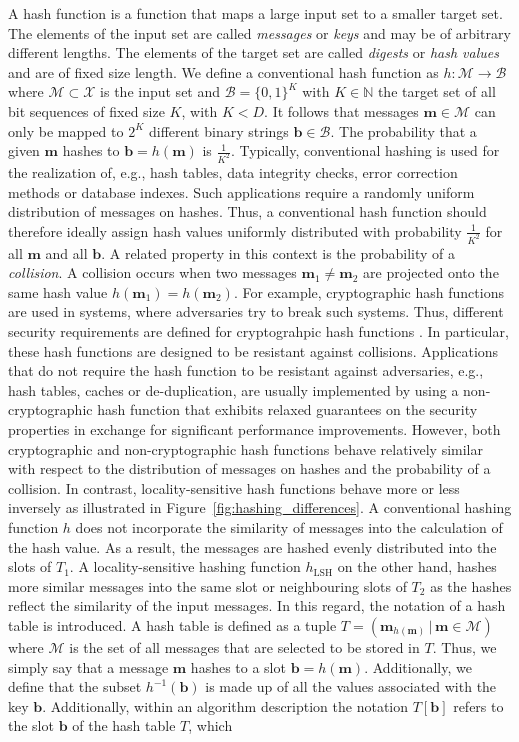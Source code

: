 \documentclass[../../../main.tex]{subfiles}
\begin{document}
A hash function is a function that maps a large input set to a smaller target set. The elements of the input set are called \textit{messages} or \textit{keys} and may be of arbitrary different lengths. The elements of the target set are called \textit{digests} or \textit{hash values} and are of fixed size length. We define a conventional hash function as $h: \mathcal{M} \rightarrow \mathcal{B}$ where $\mathcal{M} \subset \mathcal{X}$ is the input set and $\mathcal{B}=\{0, 1\}^K$ with $K \in \mathbb{N}$ the target set of all bit sequences of fixed size $K$, with $K < D$. It follows that messages $\bm{m} \in \mathcal{M}$ can only be mapped to $2^K$ different binary strings $\bm{b} \in \mathcal{B}$. The probability that a given $\bm{m}$ hashes to $\bm{b} = h(\bm{m})$ is $\frac{1}{K^2}$. Typically, conventional hashing is used for the realization of, e.g., hash tables, data integrity checks, error correction methods or database indexes. Such applications require a randomly uniform distribution of messages on hashes. Thus, a conventional hash function should therefore ideally assign hash values uniformly distributed with probability $\frac{1}{K^2}$ for all $\bm{m}$ and all $\bm{b}$. A related property in this context is the probability of a \textit{collision}. A collision occurs when two messages $\bm{m}_1 \neq \bm{m}_2$ are projected onto the same hash value $h(\bm{m}_1) = h(\bm{m}_2)$. For example, cryptographic hash functions are used in systems, where adversaries try to break such systems. Thus, different security requirements are defined for cryptograhpic hash functions \cite[349]{williamcryptography}. In particular, these hash functions are designed to be resistant against collisions. Applications that do not require the hash function to be resistant against adversaries, e.g., hash tables, caches or de-duplication, are usually implemented by using a non-cryptographic hash function that exhibits relaxed guarantees on the security properties in exchange for significant performance improvements. However, both cryptographic and non-cryptographic hash functions behave relatively similar with respect to the distribution of messages on hashes and the probability of a collision. In contrast, locality-sensitive hash functions behave more or less inversely as illustrated in Figure~\ref{fig:hashing_differences}. A conventional hashing function $h$ does not incorporate the similarity of messages into the calculation of the hash value. As a result, the messages are hashed evenly distributed into the slots of $T_1$. A locality-sensitive hashing function $h_{\text{LSH}}$ on the other hand, hashes more similar messages into the same slot or neighbouring slots of $T_2$ as the hashes reflect the similarity of the input messages. In this regard, the notation of a hash table is introduced. A hash table is defined as a tuple $T=(\bm{m}_{h(\bm{m})} \, | \, \bm{m} \in \mathcal{M})$ where $\mathcal{M}$ is the set of all messages that are selected to be stored in $T$. Thus, we simply say that a message $\bm{m}$ hashes to a slot $\bm{b} = h(\bm{m})$. Additionally, we define that the subset $h^{-1}(\bm{b})$ is made up of all the values associated with the key $\bm{b}$. Additionally, within an algorithm description the notation $T[\bm{b}]$ refers to the slot $\bm{b}$ of the hash table $T$, which 
\end{document}
